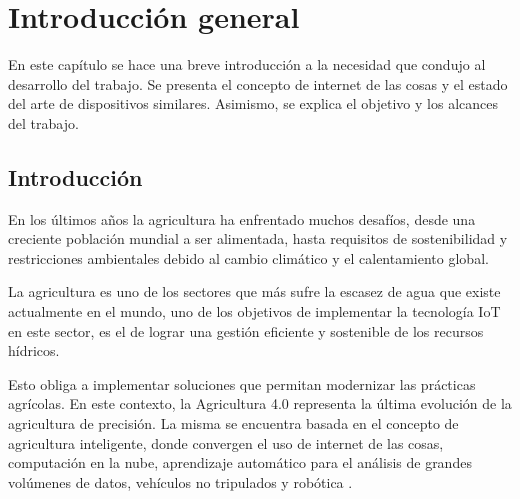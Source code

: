 
\chapter{Introducción general} %
En este capítulo se hace una breve introducción a la necesidad que condujo al desarrollo del trabajo. Se presenta el concepto de internet de las cosas y el estado del arte de dispositivos similares. Asimismo, se explica el objetivo y los alcances del trabajo.
\label{Chapter1} %
\label{IntroGeneral}


\newcommand{\keyword}[1]{\textbf{#1}}
\newcommand{\tabhead}[1]{\textbf{#1}}
\newcommand{\code}[1]{\texttt{#1}}
\newcommand{\file}[1]{\texttt{\bfseries#1}}
\newcommand{\option}[1]{\texttt{\itshape#1}}
\newcommand{\grados}{$^{\circ}$}



\section{Introducción}
En los últimos años la agricultura ha enfrentado muchos desafíos, desde una creciente población mundial a ser alimentada, hasta requisitos de sostenibilidad y restricciones ambientales debido al cambio climático y el calentamiento global.

La agricultura es uno de los sectores que más sufre la escasez de agua que existe actualmente en el mundo, uno de los objetivos de implementar la tecnología IoT en este sector, es el de lograr una gestión eficiente y sostenible de los recursos hídricos.

Esto obliga a implementar soluciones que permitan modernizar las prácticas agrícolas. En este contexto, la Agricultura 4.0 representa la última evolución de la  agricultura de precisión. La misma se encuentra basada en el concepto de agricultura inteligente, donde convergen el uso de internet de las cosas, computación
en la nube, aprendizaje automático para el análisis de grandes volúmenes de datos, vehículos no tripulados y robótica \citep{Agriculture4.0}.

